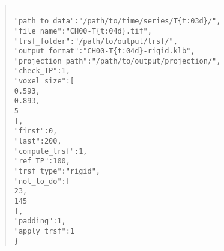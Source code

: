 \documentclass[10pt,a4paper]{book}
\newcommand\tab[1][.6cm]{\hspace*{#1}}
\newenvironment{code}[1]{\mbox{}\\[1ex]\hspace*{-#1cm}\begin{minipage}{150mm}\begin{quote}\tt}{\end{quote}\end{minipage}\mbox{}\\[1ex]}
\begin{document}
\begin{code}{0.8}
\{\\
\tab"path\_to\_data":"/path/to/time/series/T\{t:03d\}/",\\
\tab"file\_name":"CH00-T\{t:04d\}.tif",\\
\tab"trsf\_folder":"/path/to/output/trsf/",\\
\tab"output\_format":"CH00-T\{t:04d\}-rigid.klb",\\
\tab"projection\_path":"/path/to/output/projection/",\\
\tab"check\_TP":1,\\
\tab"voxel\_size":[\\
\tab\tab0.593,\\
\tab\tab0.893,\\
\tab\tab5\\
\tab],\\
\tab"first":0,\\
\tab"last":200,\\
\tab"compute\_trsf":1,\\
\tab"ref\_TP":100,\\
\tab"trsf\_type":"rigid",\\
\tab"not\_to\_do":[\\
\tab\tab23,\\
\tab\tab145\\
\tab],\\
\tab"padding":1,\\
\tab"apply\_trsf":1\\
\}
\end{code}
\end{document}
